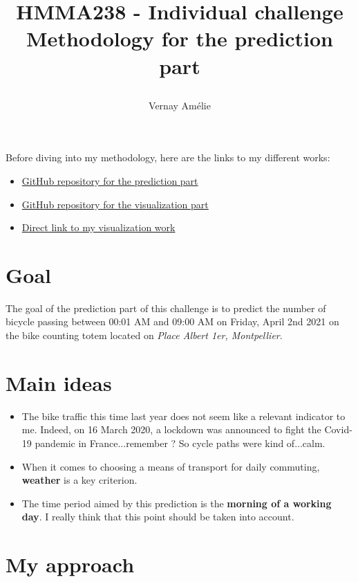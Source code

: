 \documentclass[11pt,a4paper]{article}
\author{Vernay Amélie}
\title{%
    \begin{minipage}\linewidth
        \centering
        HMMA238 - Individual challenge
        \vskip3pt
        \large Methodology for the prediction part
    \end{minipage}
}
\begin{document}
\maketitle

Before diving into my methodology, here are the links to my different works:
\begin{itemize}
\item \href{https://github.com/AmelieVernay/Pred_Bike_Challenge}{GitHub repository for the prediction part}
\item \href{https://github.com/AmelieVernay/MtpBikeViz}{GitHub repository for the visualization part}
\item \href{https://amelievernay.pythonanywhere.com/}{Direct link to my visualization work}
\end{itemize}

\section*{Goal}

The goal of the prediction part of this challenge is to predict the number of bicycle passing between 00:01 AM and 09:00 AM on Friday, April 2nd 2021 on the bike counting totem located on \textit{Place Albert 1er, Montpellier}.

\section*{Main ideas}

\begin{itemize}
\item The bike traffic this time last year does not seem like a relevant indicator to me. Indeed, on 16 March 2020, a lockdown was announced to fight the Covid-19 pandemic in France...remember ? So cycle paths were kind of...calm.
\item When it comes to choosing a means of transport for daily commuting, \textbf{weather} is a key criterion.
\item The time period aimed by this prediction is the \textbf{morning of a working day}. I really think that this point should be taken into account.
\end{itemize}

\section*{My approach}
\end{document}
